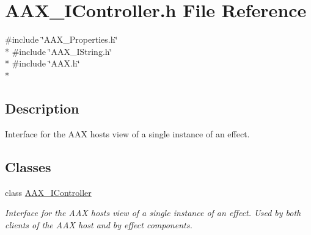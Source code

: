 \hypertarget{a00239}{}\section{A\+A\+X\+\_\+\+I\+Controller.\+h File Reference}
\label{a00239}
{\ttfamily \#include \char`\"{}A\+A\+X\+\_\+\+Properties.\+h\char`\"{}}\\*
{\ttfamily \#include \char`\"{}A\+A\+X\+\_\+\+I\+String.\+h\char`\"{}}\\*
{\ttfamily \#include \char`\"{}A\+A\+X.\+h\char`\"{}}\\*


\subsection{Description}
Interface for the A\+A\+X host\textquotesingle{}s view of a single instance of an effect. 

\subsection*{Classes}
\begin{DoxyCompactItemize}
\item 
class \hyperlink{a00090}{A\+A\+X\+\_\+\+I\+Controller}
\begin{DoxyCompactList}\small\item\em Interface for the A\+A\+X host\textquotesingle{}s view of a single instance of an effect. Used by both clients of the A\+A\+X host and by effect components. \end{DoxyCompactList}\end{DoxyCompactItemize}
